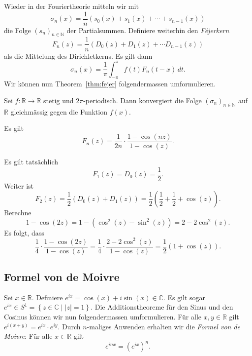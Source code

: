 \documentclass[../main.tex]{subfiles}
\begin{document}
Wieder in der Fouriertheorie mitteln wir mit
\[
  \sigma_n(x) = \frac{1}{n}(s_0 (x) + s_1(x) + \cdots + s_{n-1}(x))
\]
die Folge ${(s_{n})}_{n \in \mathbb{N}}$ der Partialsummen. Definiere
weiterhin den \emph{Féjerkern}
\[
  F_n(z) = \frac{1}{n}(D_0(z) + D_1(z) + \cdots D_{n-1}(z))
\]
als die Mittelung des Dirichletkerns. Es gilt dann
\[
  \sigma_n(x) = \frac{1}{\pi} \int_{-\pi}^{\pi} f(t) F_n(t-x) \, dt.
\]
Wir können nun Theorem~\ref{thm:fejer} folgendermassen umformulieren.

\begingroup
\def\thetheorem{\ref{thm:fejer}}
\begin{theorem}[Fejér]
  Sei $f \colon \mathbb{R} \to \mathbb{R}$ 
  stetig und $2\pi$-periodisch. Dann konvergiert
  die Folge ${(\sigma_{n})}_{n \in \mathbb{N}}$ 
  auf $\mathbb{R}$ gleichmässig gegen
  die Funktion $f(x)$.
\end{theorem}
\addtocounter{theorem}{-1}
\endgroup

\begin{lemma}\label{lem:fejerkern}
  Es gilt
  \[
    F_n(z) = \frac{1}{2n} \cdot \frac{1 - \cos(nz)}{1 - \cos(z)}.
  \]
\end{lemma}

\begin{example}
  Es gilt tatsächlich
  \[
    F_1(z) = D_0(z) = \frac{1}{2}.
  \]
  Weiter ist
  \[
    F_2(z) = \frac{1}{2}(D_0(z) + D_1(z)) = 
    \frac{1}{2}\left(\frac{1}{2} + \frac{1}{2} + \cos(z)\right).
  \]
  Berechne
  \[
    1 - \cos(2z) = 1 - (\cos^2(z) - \sin^2(z))
    = 2 - 2\cos^2(z).
  \]
  Es folgt, dass
  \[
    \frac{1}{4} \cdot \frac{1 - \cos(2z)}{1 - \cos(z)}
    = \frac{1}{4} \cdot \frac{2 - 2 \cos^2(z) }{1 - \cos(z)}
    = \frac{1}{2} (1 + \cos(z)).
  \]
\end{example}

\subsection*{Formel von de Moivre}
Sei $x \in \mathbb{R}$.
Definiere $e^{ix} = \cos(x) + i \sin(x) \in \mathbb{C}$.
Es gilt sogar
\(
  e^{ix} \in S^1 = \left\{z \in \mathbb{C} \mid |z|  = 1 \right\}
\).
Die Additionstheoreme für den Sinus und den Cosinus können wir
nun folgendermassen umformulieren. Für alle $x, y \in \mathbb{R}$ 
gilt
\(
  e^{i(x + y)} = e^{ix} \cdot e^{iy}.
\)
Durch $n$-maliges Anwenden erhalten wir die \emph{Formel von de Moivre}:
Für alle $x \in \mathbb{R}$ gilt
\[
  e^{inx} = {(e^{ix})}^n.
\]
\end{document}
